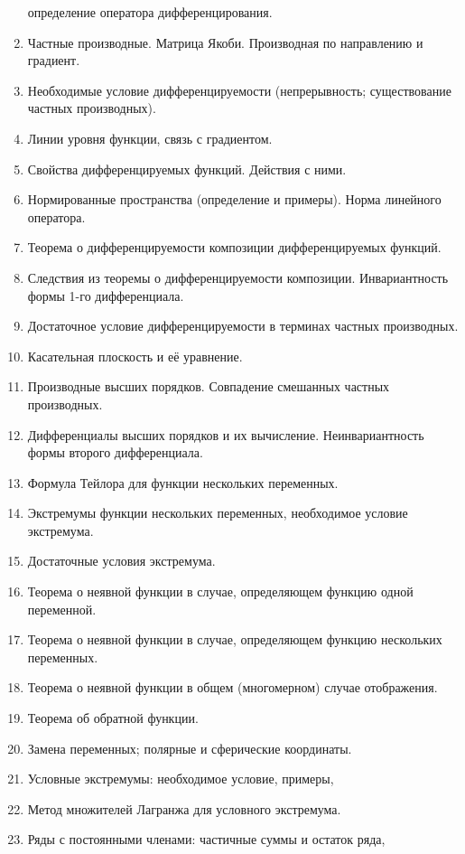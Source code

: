 \documentclass{article}
\begin{document}
\begin{enumerate}
          определение оператора дифференцирования.
    \item Частные производные. Матрица Якоби. Производная по
          направлению и градиент.
    \item Необходимые условие
          дифференцируемости (непрерывность;
          существование частных производных).
    \item Линии уровня функции, связь с градиентом.
    \item Свойства дифференцируемых функций. Действия с ними.
    \item Нормированные пространства (определение и примеры). Норма
          линейного оператора.
    \item Теорема о дифференцируемости композиции дифференцируемых
          функций.
    \item Следствия из теоремы о дифференцируемости композиции.
          Инвариантность формы 1-го дифференциала.
    \item Достаточное условие дифференцируемости в терминах частных
          производных.
    \item Касательная плоскость и её уравнение.
    \item Производные высших порядков. Совпадение смешанных
          частных производных.
    \item Дифференциалы высших порядков и их вычисление.
          Неинвариантность формы второго дифференциала.
    \item Формула Тейлора для функции нескольких переменных.
    \item Экстремумы функции нескольких переменных, необходимое
          условие экстремума.
    \item Достаточные условия экстремума.
    \item Теорема о неявной функции в случае, определяющем функцию
          одной переменной.
    \item Теорема о неявной функции в случае, определяющем функцию
          нескольких переменных.
    \item Теорема о неявной функции в общем (многомерном) случае
          отображения.
    \item Теорема об обратной функции.
    \item Замена переменных; полярные и сферические координаты.
    \item Условные экстремумы: необходимое условие, примеры,
    \item Метод множителей Лагранжа для условного экстремума.
    \item Ряды с постоянными членами: частичные суммы и остаток ряда,

\end{enumerate}
\end{document}
